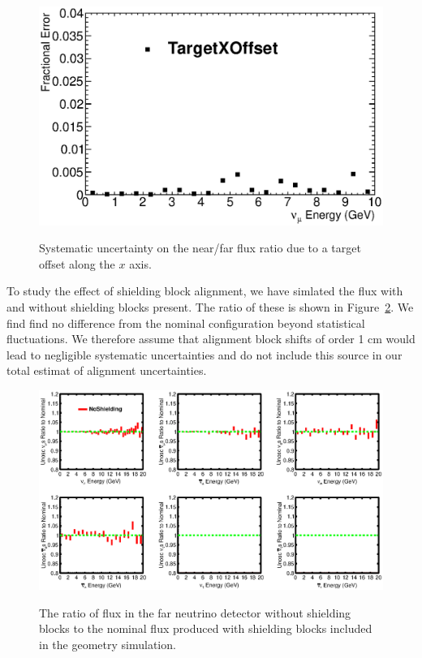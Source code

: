 \begin{figure}[ht]
\label{fig:TargetXOffset_nof_error}
  \begin{center}
    {\includegraphics[width=6.0in]{figures/TargetXOffset_nof_error.eps}}
  \end{center}
\caption{ Systematic uncertainty on the near/far flux ratio due to a target offset along the $x$ axis. }
\end{figure}

To study the effect of shielding block alignment, we have simlated the flux with and without shielding blocks present.  The ratio of these is shown in Figure~\ref{fig:shielding_far}. We find find no difference from the nominal configuration beyond statistical fluctuations.  We therefore assume that alignment block shifts of order 1 cm would lead to negligible systematic uncertainties and do not include this source in our total estimat of alignment uncertainties.

\begin{figure}[ht]
\label{fig:shielding_far}
  \begin{center}
    {\includegraphics[width=6.0in]{figures/comp_flux_ratios_FHC_unoscillated_Nominal_NoShielding_far.eps}}
  \end{center}
\caption{ The ratio of flux in the far neutrino detector without shielding blocks to the nominal flux produced with shielding blocks included in the geometry simulation. }
\end{figure}


